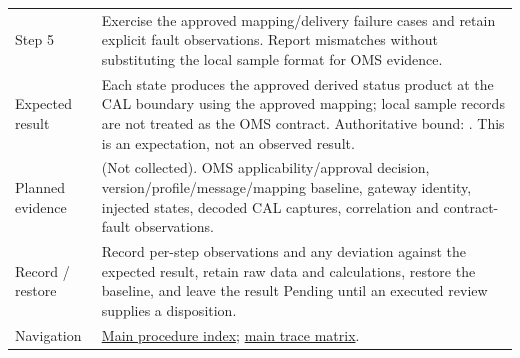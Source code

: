 \begin{tabularx}{\linewidth}{L{3.2cm}Y}
Step 5 & Exercise the approved mapping/delivery failure cases and retain explicit fault observations. Report mismatches without substituting the local sample format for OMS evidence.\\
Expected result & Each state produces the approved derived status product at the CAL boundary using the approved mapping; local sample records are not treated as the OMS contract. Authoritative bound: . This is an expectation, not an observed result.\\
Planned evidence &  (Not collected). OMS applicability/approval decision, version/profile/message/mapping baseline, gateway identity, injected states, decoded CAL captures, correlation and contract-fault observations.\\
Record / restore & Record per-step observations and any deviation against the expected result, retain raw data and calculations, restore the baseline, and leave the result Pending until an executed review supplies a disposition.\\
Navigation & \hyperref[Table:WeekTwoTests]{Main procedure index}; \hyperref[Table:TraceabilityMatrix]{main trace matrix}.\\
\end{tabularx}
\normalsize
